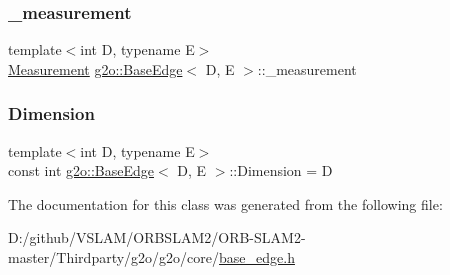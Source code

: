 \mbox{\label{classg2o_1_1_base_edge_af2a6ab1df6e91601b4cab23e0e99e034}} 
\subsubsection{\texorpdfstring{\+\_\+measurement}{\_measurement}}
{\footnotesize\ttfamily template$<$int D, typename E$>$ \\
\mbox{\hyperlink{classg2o_1_1_base_edge_a2c148abba650a20b8c7eed75d3e2211e}{Measurement}} \mbox{\hyperlink{classg2o_1_1_base_edge}{g2o\+::\+Base\+Edge}}$<$ D, E $>$\+::\+\_\+measurement\hspace{0.3cm}{\ttfamily [protected]}}

\mbox{\label{classg2o_1_1_base_edge_ab4812acb21e0b9de80dc6d676e71cb70}} 
\subsubsection{\texorpdfstring{Dimension}{Dimension}}
{\footnotesize\ttfamily template$<$int D, typename E$>$ \\
const int \mbox{\hyperlink{classg2o_1_1_base_edge}{g2o\+::\+Base\+Edge}}$<$ D, E $>$\+::Dimension = D\hspace{0.3cm}{\ttfamily [static]}}



The documentation for this class was generated from the following file\+:\begin{DoxyCompactItemize}
\item 
D\+:/github/\+V\+S\+L\+A\+M/\+O\+R\+B\+S\+L\+A\+M2/\+O\+R\+B-\/\+S\+L\+A\+M2-\/master/\+Thirdparty/g2o/g2o/core/\mbox{\hyperlink{base__edge_8h}{base\+\_\+edge.\+h}}\end{DoxyCompactItemize}
